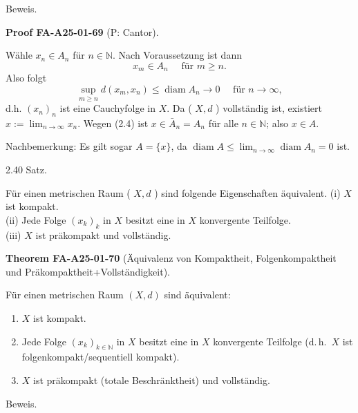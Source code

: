 \documentclass[10pt, letterpaper]{article}
\newcommand{\CustomHeading}[3]{%
  \par\medskip\noindent%
  \textbf{#1 #2} \textnormal{(#3)}.\enskip%
}
\newenvironment{THEO}[2]{\begin{unitbox}\CustomHeading{Theorem}{#1}{#2}}{\end{unitbox}}
\newenvironment{PROOF}[2]{\begin{unitbox}\CustomHeading{Proof}{#1}{#2}}{\end{unitbox}}
\begin{document}
Beweis. 

\begin{PROOF}{FA-A25-01-69}{P: Cantor}
Wähle $x_{n} \in A_{n}$ für $n \in \mathbb{N}$. Nach Voraussetzung ist dann
$$
x_{m} \in A_{n} \quad \text { für } m \geq n .
$$
Also folgt
$$
\sup _{m \geq n} d\left(x_{m}, x_{n}\right) \leq \operatorname{diam} A_{n} \rightarrow 0 \quad \text { für } n \rightarrow \infty,
$$
d.h. $\left(x_{n}\right)_{n}$ ist eine Cauchyfolge in $X$. Da ( $X, d$ ) vollständig ist, existiert $x:=\lim _{n \rightarrow \infty} x_{n}$. Wegen (2.4) ist $x \in \bar{A}_{n}=A_{n}$ für alle $n \in \mathbb{N}$; also $x \in A$.

Nachbemerkung: Es gilt sogar $A=\{x\}$, da $\operatorname{diam} A \leq \lim _{n \rightarrow \infty} \operatorname{diam} A_{n}=0$ ist.
\end{PROOF}


2.40 Satz. 


Für einen metrischen Raum ( $X, d$ ) sind folgende Eigenschaften äquivalent.
(i) $X$ ist kompakt.\\
(ii) Jede Folge $\left(x_{k}\right)_{k}$ in $X$ besitzt eine in $X$ konvergente Teilfolge.\\
(iii) $X$ ist präkompakt und vollständig.



\begin{THEO}{FA-A25-01-70}{Äquivalenz von Kompaktheit, Folgenkompaktheit und Präkompaktheit+Vollständigkeit}
Für einen metrischen Raum $(X,d)$ sind äquivalent:
\begin{enumerate}
\item[(i)] $X$ ist kompakt.
\item[(ii)] Jede Folge $(x_k)_{k\in\mathbb{N}}$ in $X$ besitzt eine in $X$ konvergente Teilfolge (d.\,h.\ $X$ ist folgenkompakt/sequentiell kompakt).
\item[(iii)] $X$ ist präkompakt (totale Beschränktheit) und vollständig.
\end{enumerate}
\end{THEO}


Beweis. 
\end{document}
